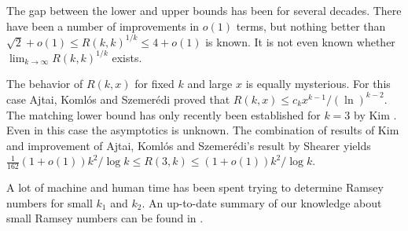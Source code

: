 \documentclass[12pt]{article}
\begin{document}
The gap between the lower and upper bounds has been  for
several decades. There have been a number of improvements in
$o(1)$ terms, but nothing better than $\sqrt{2}+o(1)\leq R(k,k)^{1/k}\leq
4+o(1)$ is known. It is not even known whether $\lim_{k\to \infty}
R(k,k)^{1/k}$ exists.

The behavior of $R(k,x)$ for fixed $k$ and large $x$ is equally
mysterious. For this case Ajtai, Koml\'os and
Szemer\'edi\cite{cite:aks_ramsey} proved that $R(k,x)\leq
c_{k}x^{k-1}/(\ln)^{k-2}$. The matching lower bound has only
recently been established for $k=3$ by Kim
\cite{cite:kim_ramsey_three}. Even in this case the asymptotics is
unknown. The combination of results of Kim and improvement of
Ajtai, Koml\'os and Szemer\'edi's result by Shearer \cite{cite:shearer_independence} yields
$\tfrac{1}{162}(1+o(1)) k^2/\log k \leq R(3,k)\leq (1+o(1))k^2/\log k$.

A lot of machine and human time has been spent trying to
determine Ramsey numbers for small $k_1$ and $k_2$. An up-to-date
summary of our knowledge about small Ramsey numbers can be found
in \cite{cite:radziszowski_smallramsey}.

\end{document}
